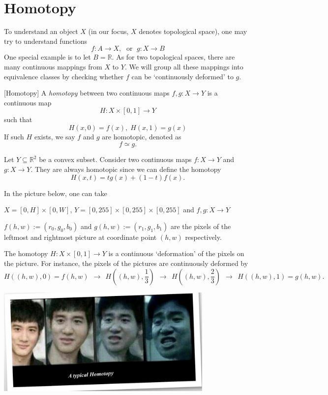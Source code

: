 \chapter{Homotopy}
To understand an object \(X\) (in our focus, \(X\) denotes topological space), one may try to understand functions
\[
f : A \rightarrow  X, \;\text{ or }\;g : X \rightarrow  B
\]
One special example is to let \(B = \mathbb{R}\). As for two topological spaces, there are many continuous mappings from \(X\) to \(Y\). We will group all these mappings into equivalence classes by checking whether $f$ can be `continuously deformed' to $g$.
\begin{definition} \label{def:homotopy} [Homotopy] A \emph{homotopy} between two continuous maps \(f, g : X \rightarrow  Y\) is a continuous map
\[
H : X \times  \left\lbrack  {0, 1}\right\rbrack   \rightarrow  Y
\]
such that
\[
H\left( {x, 0}\right)  = f\left( x\right), \;H\left( {x, 1}\right)  = g\left( x\right)
\]
If such \(H\) exists, we say \(f\) and \(g\) are homotopic, denoted as 
\[f \simeq  g.\]
\end{definition}
\begin{example} \label{eg:homotopy_convex} Let \(Y \subseteq  {\mathbb{R}}^{2}\) be a convex subset. Consider two continuous maps \(f : X \rightarrow  Y\) and \(g : X \rightarrow  Y\). They are always homotopic since we can define the homotopy
\[
H\left( {x, t}\right)  = {tg}\left( x\right)  + \left( {1 - t}\right) f\left( x\right).
\]
\end{example}

\begin{example} In the picture below, one can take 
\begin{center}
$X = [0,H] \times [0,W]$, $Y = [0,255] \times [0,255] \times [0,255]$ \quad and \quad
$f, g: X \to Y$
\end{center}
$f(h,w) := (r_0,g_0,b_0)$ and $g(h,w) := (r_1,g_1,b_1)$ are the pixels of the leftmost and rightmost picture at coordinate point $(h,w)$ respectively. 

The homotopy $H: X \times [0,1] \to Y$
is a continuous `deformation' of the pixels on the picture. For instance, the pixels of the pictures are continuously deformed by
$$H\left((h,w),0\right) = f(h,w) \ \ \to\ \  H\left((h,w),\frac{1}{3}\right)\ \ \to\ \  H\left((h,w),\frac{2}{3}\right) \ \ \to\ \ H\left((h,w),1\right) = g(h,w).$$
\begin{center}
\includegraphics[width=0.8\textwidth]{images/Ch5_Cheung.jpg}
\end{center}
\end{example}

